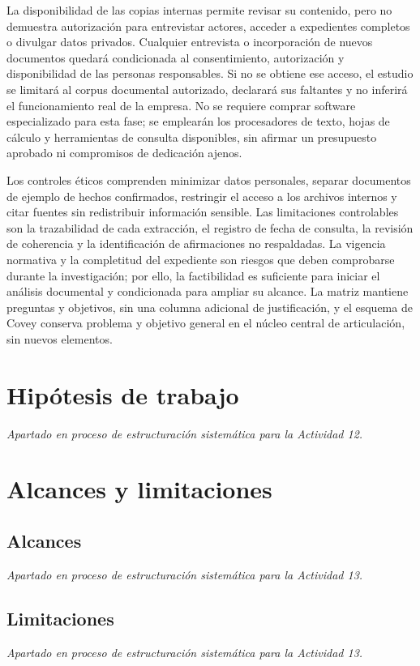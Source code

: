 {La disponibilidad de las copias internas permite revisar su contenido, pero no demuestra autorización para entrevistar actores, acceder a expedientes completos o divulgar datos privados. Cualquier entrevista o incorporación de nuevos documentos quedará condicionada al consentimiento, autorización y disponibilidad de las personas responsables. Si no se obtiene ese acceso, el estudio se limitará al corpus documental autorizado, declarará sus faltantes y no inferirá el funcionamiento real de la empresa. No se requiere comprar software especializado para esta fase; se emplearán los procesadores de texto, hojas de cálculo y herramientas de consulta disponibles, sin afirmar un presupuesto aprobado ni compromisos de dedicación ajenos.


Los controles éticos comprenden minimizar datos personales, separar documentos de ejemplo de hechos confirmados, restringir el acceso a los archivos internos y citar fuentes sin redistribuir información sensible. Las limitaciones controlables son la trazabilidad de cada extracción, el registro de fecha de consulta, la revisión de coherencia y la identificación de afirmaciones no respaldadas. La vigencia normativa y la completitud del expediente son riesgos que deben comprobarse durante la investigación; por ello, la factibilidad es suficiente para iniciar el análisis documental y condicionada para ampliar su alcance. La matriz mantiene preguntas y objetivos, sin una columna adicional de justificación, y el esquema de Covey conserva problema y objetivo general en el núcleo central de articulación, sin nuevos elementos.


\section{Hipótesis de trabajo}
\emph{Apartado en proceso de estructuración sistemática para la Actividad 12.}

\section{Alcances y limitaciones}
\subsection{Alcances}
\emph{Apartado en proceso de estructuración sistemática para la Actividad 13.}

\subsection{Limitaciones}
\emph{Apartado en proceso de estructuración sistemática para la Actividad 13.}

}
